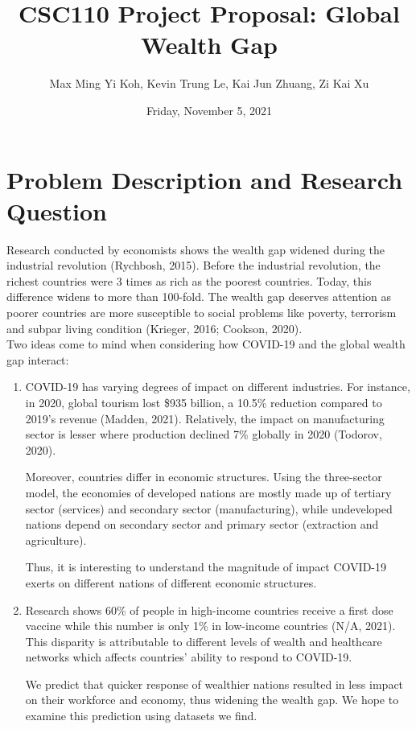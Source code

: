 \documentclass[fontsize=11pt]{article}
\title{CSC110 Project Proposal: Global Wealth Gap}
\author{Max Ming Yi Koh, Kevin Trung Le, Kai Jun Zhuang, Zi Kai Xu}
\date{Friday, November 5, 2021}
\begin{document}
\maketitle

\section*{Problem Description and Research Question}
Research conducted by economists shows the wealth gap widened during the industrial revolution (Rychbosh, 2015). Before the industrial revolution, the richest countries were 3 times as rich as the poorest countries. Today, this difference widens to more than 100-fold. The wealth gap deserves attention as poorer countries are more susceptible to social problems like poverty, terrorism and subpar living condition (Krieger, 2016; Cookson, 2020).
\\

\noindent Two ideas come to mind when considering how COVID-19 and the global wealth gap interact:

\begin{enumerate}
    \item COVID-19 has varying degrees of impact on different industries. For instance, in 2020, global tourism lost \$935 billion, a 10.5\% reduction compared to 2019’s revenue (Madden, 2021). Relatively, the impact on manufacturing sector is lesser where production declined 7\% globally in 2020 (Todorov, 2020).

    Moreover, countries differ in economic structures. Using the three-sector model, the economies of developed nations are mostly made up of tertiary sector (services) and secondary sector (manufacturing), while undeveloped nations depend on secondary sector and primary sector (extraction and agriculture).

    Thus, it is interesting to understand the magnitude of impact COVID-19 exerts on different nations of different economic structures.

    \item Research shows 60\% of people in high-income countries receive a first dose vaccine while this number is only 1\% in low-income countries (N/A, 2021). This disparity is attributable to different levels of wealth and healthcare networks which affects countries’ ability to respond to COVID-19.

    We predict that quicker response of wealthier nations resulted in less impact on their workforce and economy, thus widening the wealth gap. We hope to examine this prediction using datasets we find.
\end{enumerate}
\end{document}

